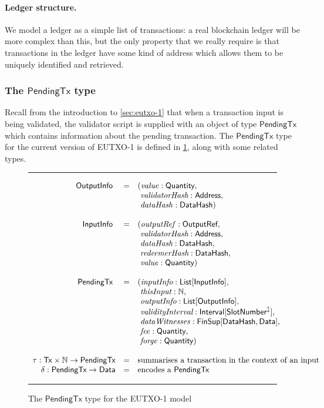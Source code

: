 \documentclass[a4paper]{article}
\renewcommand{\i}{\textit}  %
\newcommand{\s}{\textsf}  %
\newcommand{\msf}[1]{\ensuremath{\mathsf{#1}}}
\newcommand{\mi}[1]{\ensuremath{\mathit{#1}}}
\newcommand\rfskip{7pt}
\newenvironment{ruledfigure}[1]{\begin{figure}[#1]\hrule\vspace{\rfskip}}{\vspace{\rfskip}\hrule\end{figure}}
\newcommand{\List}[1]{\ensuremath{\s{List}[#1]}}
\newcommand{\Interval}[1]{\ensuremath{\s{Interval}[#1]}}
\newcommand{\extended}[1]{#1^\updownarrow}
\newcommand{\FinSup}[2]{\ensuremath{\s{FinSup}[#1,#2]}}
\newcommand{\ptx}{\ensuremath{\s{PendingTx}}}
\newcommand{\Address}{\ensuremath{\s{Address}}}
\newcommand{\DataHash}{\ensuremath{\s{DataHash}}}
\newcommand{\forge}{\mi{forge}}
\newcommand{\fee}{\mi{fee}}
\newcommand{\val}{\mi{value}}  %
\newcommand{\dataHsh}{\mi{dataHash}}
\newcommand{\dataWits}{\mi{dataWitnesses}}
\newcommand{\Data}{\ensuremath{\s{Data}}}
\newcommand{\outputref}{\mi{outputRef}}
\newcommand{\slotnum}{\ensuremath{\s{SlotNumber}}}
\newcommand{\eutxotx}{\msf{Tx}}
\newcommand{\qty}{\ensuremath{\s{Quantity}}}
\newcommand\N{\ensuremath{\mathbb{N}}}
\begin{document}
\paragraph{Ledger structure.} We model a ledger as a simple
list of transactions: a real blockchain ledger will be more complex
than this, but the only property that we really require is that
transactions in the ledger have some kind of address which allows them
to be uniquely identified and retrieved.

\subsubsection{The \ptx{} type}
\label{sec:pendingtx}
Recall from the introduction to \cref{sec:eutxo-1} that when a
transaction input is being validated, the validator script is supplied
with an object of type \ptx{} which contains information about the
pending transaction.  The \ptx{} type for the current version of
EUTXO-1 is defined in \cref{fig:ptx-1-types}, along with some
related types.

\begin{ruledfigure}{H}
  \begin{displaymath}
  \begin{array}{rll}
    \s{OutputInfo } &=&(\val: \qty,\\
                    & &\ \i{validatorHash}: \Address,\\
                    & &\ \dataHsh: \DataHash)\\
    \\
    \s{InputInfo } &=&(\outputref: \s{OutputRef},\\
                   & &\ \i{validatorHash}: \Address,\\
                   & &\ \i{dataHash}: \DataHash,\\
                   & &\ \i{redeemerHash}: \DataHash,\\
                   & &\ \val: \qty)\\
     \\
     \ptx\s{ } &=&(\i{inputInfo}: \List{\s{InputInfo}},\\
               & &\ \i{thisInput}: \N,\\
               & &\ \i{outputInfo}: \List{\s{OutputInfo}},\\
               & &\ \i{validityInterval}: \Interval{\extended{\slotnum}},\\
               & &\ \dataWits: \FinSup{\DataHash}{\Data},\\
               & &\ \fee: \qty,\\
               & &\ \forge: \qty)\\
     \\
     \tau: \eutxotx \times \N \rightarrow \ptx &=& \mbox{summarises a transaction in the context of an input}\\
     \delta: \ptx \rightarrow \Data &=& \mbox{encodes a \ptx{}}
  \end{array}
  \end{displaymath}
  \caption{The \ptx{} type for the EUTXO-1 model}
  \label{fig:ptx-1-types}
\end{ruledfigure}
\end{document}
